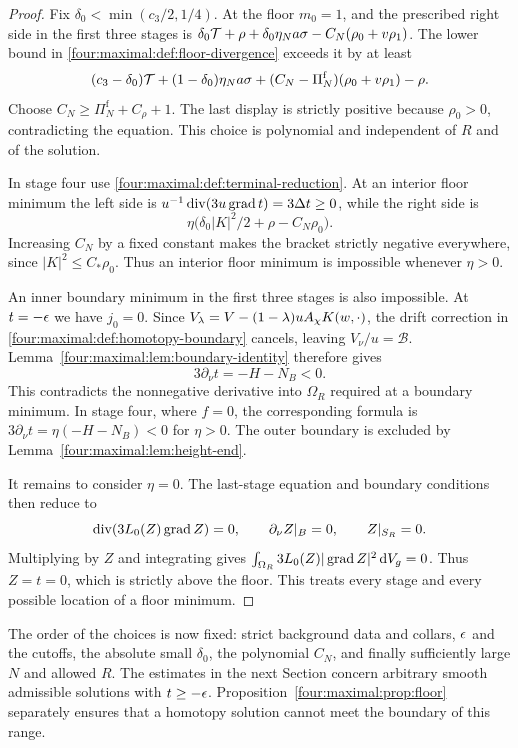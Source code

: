 \begin{proof}
Fix $\delta_0<\min(c_3/2,1/4)$.  At the floor $m_0=1$, and the prescribed
right side in the first three stages is
$\delta_0\mathcal T+\rho+\delta_0\eta_N a\sigma-C_N(\rho_0+v\rho_1)$.
The lower bound in \eqref{four:maximal:def:floor-divergence} exceeds it by at least
\[
 (c_3-\delta_0)\mathcal T+(1-\delta_0)\eta_N a\sigma
 +(C_N-\Pi_N^{\mathrm f})(\rho_0+v\rho_1)-\rho.
\]
Choose $C_N\ge\Pi_N^{\mathrm f}+C_\rho+1$.  The last display is strictly
positive because $\rho_0>0$, contradicting the equation.  This choice is
polynomial and independent of $R$ and of the solution.

In stage four use \eqref{four:maximal:def:terminal-reduction}.  At an interior floor
minimum the left side is
$u^{-1}\operatorname{div}(3u\operatorname{grad} t)=3\Delta t\ge0$,
while the right side is
\[
 \eta\bigl(\delta_0|K|^2/2+\rho-C_N\rho_0\bigr).
\]
Increasing $C_N$ by a fixed constant makes the bracket strictly negative
everywhere, since $|K|^2\le C_*\rho_0$.  Thus an interior floor minimum
is impossible whenever $\eta>0$.

An inner boundary minimum in the first three stages is also impossible.
At $t=-\epsilon$ we have $j_0=0$.  Since
$V_\lambda=V-(1-\lambda)uA_\chi K(w,\cdot)$, the drift correction in
\eqref{four:maximal:def:homotopy-boundary} cancels, leaving $V_\nu/u=\mathcal B$.
Lemma~\ref{four:maximal:lem:boundary-identity} therefore gives
\[
 3\partial_\nu t=-H-N_B<0.
\]
This contradicts the nonnegative derivative into $\Omega_R$ required
at a boundary minimum.  In stage four, where $f=0$, the corresponding
formula is $3\partial_\nu t=\eta(-H-N_B)<0$ for $\eta>0$.
The outer boundary is excluded by Lemma~\ref{four:maximal:lem:height-end}.

It remains to consider $\eta=0$.  The last-stage equation and boundary
conditions then reduce to
\[
 \operatorname{div}(3L_0(Z)\operatorname{grad} Z)=0,\qquad
 \partial_\nu Z|_B=0,\qquad Z|_{S_R}=0.
\]
Multiplying by $Z$ and integrating gives
$\int_{\Omega_R}3L_0(Z)|\operatorname{grad} Z|^2\,\mathrm d V_g=0$.
Thus $Z=t=0$, which is strictly above the floor.  This treats every
stage and every possible location of a floor minimum.
\end{proof}

The order of the choices is now fixed: strict background data and
collars, $\epsilon$ and the cutoffs, the absolute small $\delta_0$, the
polynomial $C_N$, and finally sufficiently large $N$ and allowed $R$.
The estimates in the next Section concern arbitrary smooth admissible
solutions with $t\ge-\epsilon$.  Proposition~\ref{four:maximal:prop:floor} separately
ensures that a homotopy solution cannot meet the boundary of this range.

